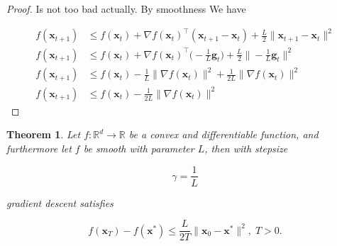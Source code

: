 \documentclass{article}
\newtheorem{theorem}{Theorem}[section]
\begin{document}
	\begin{proof}
		Is not too bad actually. By smoothness We have
		
		\begin{align*}
			f(\mathbf{x}_{t+1}) &\le f(\mathbf{x}_t) + \nabla f(\mathbf{x}_t)^\top(\mathbf{x}_{t+1} - \mathbf{x}_t) + \frac{L}{2}\| \mathbf{x}_{t+1} - \mathbf{x}_t \|^2\\
			f(\mathbf{x}_{t+1}) &\le f(\mathbf{x}_t) + \nabla f(\mathbf{x}_t)^\top \bigg(-\frac{1}{L}\mathbf{g}_t \bigg) + \frac{L}{2} \bigg\| -\frac{1}{L}\mathbf{g}_t \bigg\|^2\\
			f(\mathbf{x}_{t+1}) &\le f(\mathbf{x}_t) -\frac{1}{L}\| \nabla f(\mathbf{x}_t) \|^2 + \frac{1}{2L} \| \nabla f(\mathbf{x}_t) \|^2\\
			f(\mathbf{x}_{t+1}) &\le f(\mathbf{x}_t) -\frac{1}{2L}\| \nabla f(\mathbf{x}_t) \|^2
		\end{align*}
	\end{proof}
	
	\begin{theorem}
		Let $f:\mathbb{R}^d\to\mathbb{R}$ be a convex and differentiable function, and furthermore let $f$ be smooth with parameter $L$, then with stepsize
		
		\[ \gamma = \frac{1}{L} \]
		
		gradient descent satisfies
		
		\[ f(\mathbf{x}_T) - f(\mathbf{x^*}) \le \frac{L}{2T} \|\mathbf{x}_0 - \mathbf{x}^* \|^2,\; T>0.  \]
	\end{theorem}
	
\end{document}
